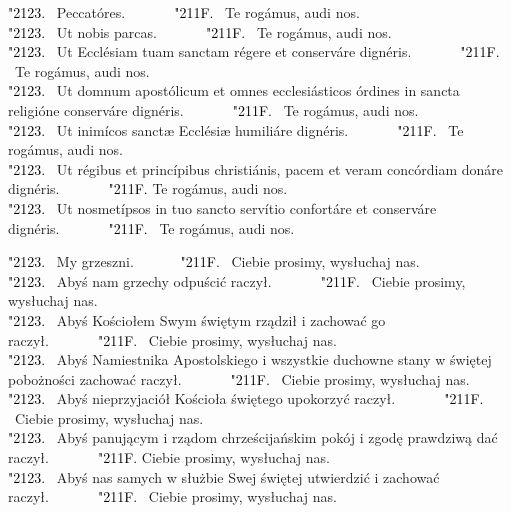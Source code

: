 \documentclass[10pt,a5paper]{book}
\newcommand{\kol}{black}
\newcommand{\textjuni}[1]{{\fontspec{Junicode-Regular}#1}}
\newcommand{\vv}{\textcolor{\kol}{\textjuni{\char"2123. }}}
\newcommand{\rrr}{\newline\textcolor{\kol}{\textjuni{~~~~~~\char"211F. }}}
\newcommand{\oremuss}[2]{
	\begin{sloppypar}
		\begin{paracol}{2}
			\setlength{\columnsep}{0em}
			\begin{leftcolumn}
				#1
			\end{leftcolumn}
			\begin{rightcolumn}
				#2
			\end{rightcolumn}
		\end{paracol}
	\end{sloppypar}}
\begin{document}
						\oremuss{
							\vv Peccatóres. \rrr Te rogámus, audi nos.\\
							\vv Ut nobis parcas. \rrr Te rogámus, audi nos.\\ 
							\vv Ut Ecclésiam tuam sanctam régere et conserváre dignéris. \rrr Te rogámus, audi nos.\\ 
							\vv Ut domnum apostólicum et omnes ecclesiásticos órdines in sancta religióne conserváre dignéris. \rrr Te rogámus, audi nos.\\
							\vv Ut inimícos sanctæ Ecclésiæ humiliáre dignéris. \rrr Te rogámus, audi nos.\\
							\vv Ut régibus et princípibus christiánis, pacem et veram concórdiam donáre dignéris. \rrr Te rogámus, audi nos.\\
							\vv Ut nosmetípsos in tuo sancto servítio confortáre et conserváre dignéris. \rrr Te rogámus, audi nos.}{
							\vv My grzeszni. \rrr Ciebie prosimy, wysłuchaj nas.\\
							\vv Abyś nam grzechy odpuścić raczył. \rrr Ciebie prosimy, wysłuchaj nas.\\
							\vv Abyś Kościołem Swym świętym rządził i zachować go raczył. \rrr Ciebie prosimy, wysłuchaj nas.\\
							\vv Abyś Namiestnika Apostolskiego i wszystkie duchowne stany w świętej pobożności zachować raczył. \rrr Ciebie prosimy, wysłuchaj nas.\\
							\vv Abyś nieprzyjaciół Kościoła świętego upokorzyć raczył. \rrr Ciebie prosimy, wysłuchaj nas.\\
							\vv Abyś panującym i rządom chrześcijańskim pokój i zgodę prawdziwą dać raczył. \rrr Ciebie prosimy, wysłuchaj nas.\\
							\vv Abyś nas samych w służbie Swej świętej utwierdzić i zachować raczył. \rrr Ciebie prosimy, wysłuchaj nas.}
						
\end{document}
